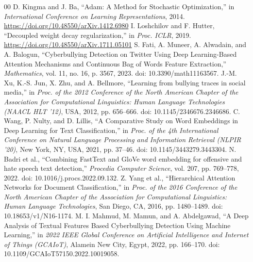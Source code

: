 \begin{thebibliography}{00}
 D. Kingma and J. Ba, ``Adam: A Method for Stochastic Optimization,'' in \textit{International Conference on Learning Representations}, 2014. \url{https://doi.org/10.48550/arXiv.1412.6980}
 I. Loshchilov and F. Hutter, ``Decoupled weight decay regularization,'' in \textit{Proc. ICLR}, 2019. \url{https://doi.org/10.48550/arXiv.1711.05101}
 S. Fati, A. Muneer, A. Alwadain, and A. Balogun, ``Cyberbullying Detection on Twitter Using Deep Learning-Based Attention Mechanisms and Continuous Bag of Words Feature Extraction,'' \textit{Mathematics}, vol. 11, no. 16, p. 3567, 2023. doi: 10.3390/math11163567.
 J.-M. Xu, K.-S. Jun, X. Zhu, and A. Bellmore, ``Learning from bullying traces in social media,'' in \textit{Proc. of the 2012 Conference of the North American Chapter of the Association for Computational Linguistics: Human Language Technologies (NAACL HLT '12)}, USA, 2012, pp. 656--666. doi: 10.1145/2346676.2346686.
 C. Wang, P. Nulty, and D. Lillis, ``A Comparative Study on Word Embeddings in Deep Learning for Text Classification,'' in \textit{Proc. of the 4th International Conference on Natural Language Processing and Information Retrieval (NLPIR '20)}, New York, NY, USA, 2021, pp. 37--46. doi: 10.1145/3443279.3443304.
 N. Badri et al., ``Combining FastText and GloVe word embedding for offensive and hate speech text detection,'' \textit{Procedia Computer Science}, vol. 207, pp. 769--778, 2022. doi: 10.1016/j.procs.2022.09.132.
 Z. Yang et al., ``Hierarchical Attention Networks for Document Classification,'' in \textit{Proc. of the 2016 Conference of the North American Chapter of the Association for Computational Linguistics: Human Language Technologies}, San Diego, CA, 2016, pp. 1480--1489. doi: 10.18653/v1/N16-1174.
 M. I. Mahmud, M. Mamun, and A. Abdelgawad, ``A Deep Analysis of Textual Features Based Cyberbullying Detection Using Machine Learning,'' in \textit{2022 IEEE Global Conference on Artificial Intelligence and Internet of Things (GCAIoT)}, Alamein New City, Egypt, 2022, pp. 166--170. doi: 10.1109/GCAIoT57150.2022.10019058.
\end{thebibliography}
